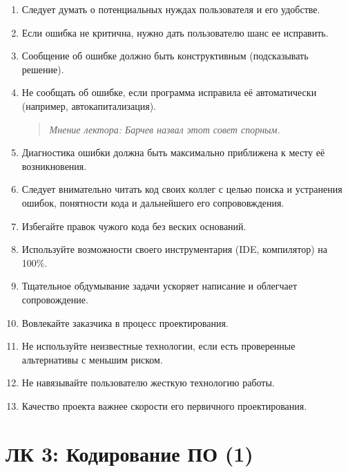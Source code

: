 \documentclass[a4paper, 12pt]{article}
\newcommand{\barchevnote}[1]{\begin{quote}\small\itshape Мнение лектора: #1\end{quote}}
\begin{document}
\begin{enumerate}[start=6]
    \item Следует думать о потенциальных нуждах пользователя и его удобстве.
    \item Если ошибка не критична, нужно дать пользователю шанс ее исправить.
    \item Сообщение об ошибке должно быть конструктивным (подсказывать решение).
    \item Не сообщать об ошибке, если программа исправила её автоматически (например, автокапитализация).
    \barchevnote{Барчев назвал этот совет спорным.}
    \item Диагностика ошибки должна быть максимально приближена к месту её возникновения.
    \item Следует внимательно читать код своих коллег с целью поиска и устранения ошибок, понятности кода и дальнейшего его сопрововждения.
    \item Избегайте правок чужого кода без веских оснований.
    \item Используйте возможности своего инструментария (IDE, компилятор) на 100\%.
    \item Тщательное обдумывание задачи ускоряет написание и облегчает сопровождение.
    \item Вовлекайте заказчика в процесс проектирования.
    \item Не используйте неизвестные технологии, если есть проверенные альтернативы с меньшим риском.
    \item Не навязывайте пользователю жесткую технологию работы.
    \item Качество проекта важнее скорости его первичного проектирования.
\end{enumerate}

\newpage

\section{ЛК 3: Кодирование ПО (1)}
\label{sec:l3}
\end{document}
